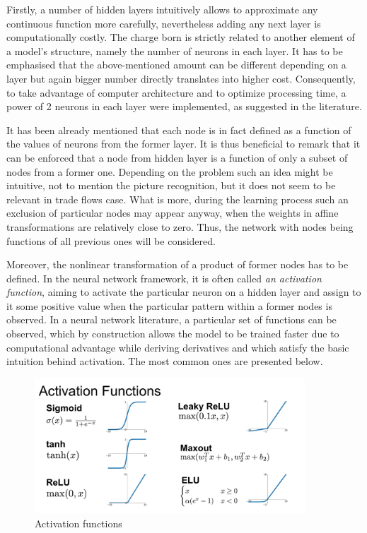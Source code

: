 \documentclass{Trade_template}
\numberwithin{equation}{section}
\begin{document}
Firstly, a number of hidden layers intuitively allows to approximate any continuous function more carefully, nevertheless adding any next layer is computationally costly. The charge born is strictly related to another element of a model’s structure, namely the number of neurons in each layer. It has to be emphasised that the above-mentioned amount can be different depending on a layer but again bigger number directly translates into higher cost. Consequently, to take advantage of computer architecture and to optimize processing time, a power of 2 neurons in each layer were implemented, as suggested in the literature.

It has been already mentioned that each node is in fact defined as a function of the values of neurons from the former layer. It is thus beneficial to remark that it can be enforced that a node from hidden layer is a function of only a subset of nodes from a former one. Depending on the problem such an idea might be intuitive, not to mention the picture recognition, but it does not seem to be relevant in trade flows case. What is more, during the learning process such an exclusion of particular nodes may appear anyway, when the weights in affine transformations are relatively close to zero. Thus, the network with nodes being functions of all previous ones will be considered.

Moreover, the nonlinear transformation of a product of former nodes has to be defined. In the neural network framework, it is often called \textit{an activation function}, aiming to activate the particular neuron on a hidden layer and assign to it some positive value when the particular pattern within a former nodes is observed. In a neural network literature, a particular set of functions can be observed, which by construction allows the model to be trained faster due to computational advantage while deriving derivatives and which satisfy the basic intuition behind activation. The most common ones are presented below.

\begin{figure}[H]
\centering
\includegraphics[width=0.9\textwidth]{Activation}
\caption[Activation functions]{Activation functions\footnotemark}
\end{figure} 
\end{document}
